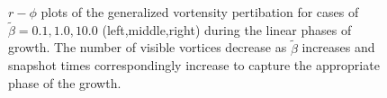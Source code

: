 \begin{figure}
  \centering
\hfill
\hfill
  \caption{$r-\phi$ plots of the generalized vortensity pertibation for cases of $\tilde{\beta}=0.1,1.0,10.0$ (left,middle,right) during the linear phases of growth. The number of visible vortices decrease as $\tilde{\beta}$ increases and snapshot times correspondingly increase to capture the appropriate phase of the growth. \label{2Dlinear}}
\end{figure}

